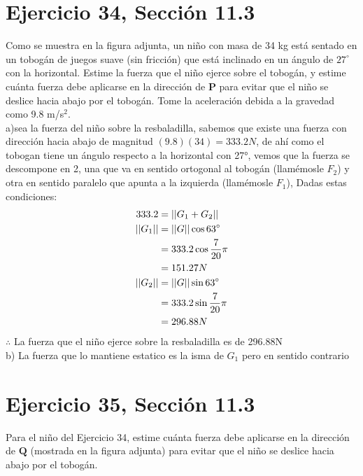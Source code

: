 \documentclass[11pt,letterpaper]{article}
\begin{document}
\section{Ejercicio 34, Sección 11.3}
Como se muestra en la figura adjunta, un niño con masa de 34 kg está sentado en un tobogán de juegos suave (sin fricción) que está inclinado en un ángulo de $27^\circ$ con la horizontal. Estime la fuerza que el niño ejerce sobre el tobogán, y estime cuánta fuerza debe aplicarse en la dirección de $\mathbf{P}$ para evitar que el niño se deslice hacia abajo por el tobogán. Tome la aceleración debida a la gravedad como 9.8 m/s$^2$.\\


a)sea la fuerza del niño sobre la resbaladilla, sabemos que existe una fuerza con dirección hacia abajo de magnitud $(9.8)(34)=333.2N$, de ahí como el tobogan tiene un ángulo respecto a la horizontal con 27°, vemos que la fuerza se descompone en 2, una que va en sentido ortogonal al tobogán (llamémosle $F_2$) y otra en sentido paralelo que apunta a la izquierda (llamémosle $F_1$), Dadas estas condiciones:
\begin{equation*}
    \begin{split}
        333.2 &= ||G_1+G_2||\\
        ||G_1||&=||G||\cos{63\degree}\\
        &=333.2\cos{\frac{7}{20}\pi}\\
        &=151.27N\\
        ||G_2||&=||G||\sin{63\degree}\\
        &=333.2\sin{\frac{7}{20}\pi}\\
        &=296.88N
    \end{split}
\end{equation*}
$\therefore$ La fuerza que el niño ejerce sobre la resbaladilla es de 296.88N\\

b) La fuerza que lo mantiene estatico es la isma de $G_1$ pero en sentido contrario

\section{Ejercicio 35, Sección 11.3}
Para el niño del Ejercicio 34, estime cuánta fuerza debe aplicarse en la dirección de $\mathbf{Q}$ (mostrada en la figura adjunta) para evitar que el niño se deslice hacia abajo por el tobogán.
\end{document}
